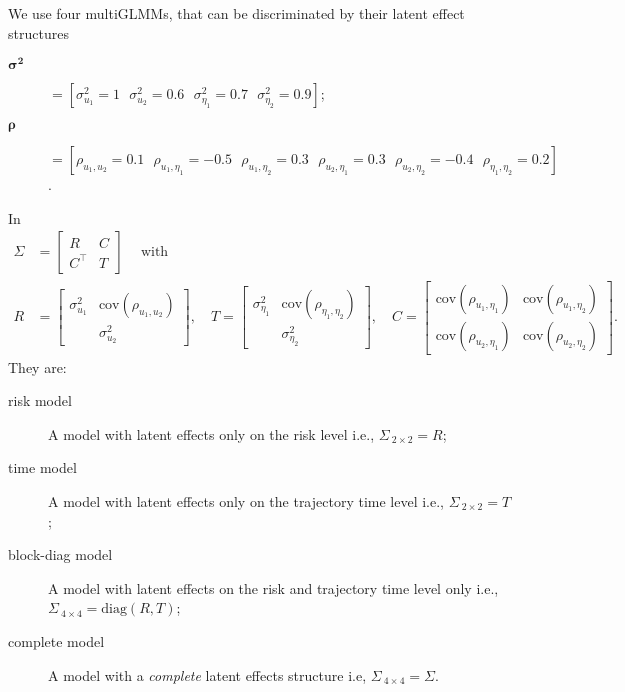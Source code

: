 We use four multiGLMMs, that can be discriminated by their latent effect
structures
\begin{description}
 \item[\(\bm{\sigma^{2}}\)] \(= [\sigma_{u_{1}}^{2} = 1~~~
                                \sigma_{u_{2}}^{2} = 0.6~~~
                                \sigma_{\eta_{1}}^{2} = 0.7~~~
                                \sigma_{\eta_{2}}^{2} = 0.9]\);
 \item[\(\bm{\rho}\)] \(= [\rho_{u_{1},u_{2}} = 0.1~~~
                           \rho_{u_{1},\eta_{1}} = -0.5~~~
                           \rho_{u_{1},\eta_{2}} = 0.3~~~
                           \rho_{u_{2},\eta_{1}} = 0.3~~~
                           \rho_{u_{2},\eta_{2}} = -0.4~~~
                           \rho_{\eta_{1},\eta_{2}} = 0.2]\).
\end{description}
In
\begin{align*}
 \Sigma &= \begin{bmatrix} R & C\\ C^{\top} & T \end{bmatrix}
 \quad~\text{with}\\
 R &= \begin{bmatrix}
       \sigma_{u_{1}}^{2} & \text{cov}(\rho_{u_{1},u_{2}})\\
                      & \sigma_{u_{2}}^{2}
      \end{bmatrix},\quad
 T = \begin{bmatrix}
      \sigma_{\eta_{1}}^{2} & \text{cov}(\rho_{\eta_{1},\eta_{2}})\\
                         & \sigma_{\eta_{2}}^{2}
     \end{bmatrix},\quad
 C = \begin{bmatrix} \text{cov}(\rho_{u_{1},\eta_{1}}) &
                     \text{cov}(\rho_{u_{1},\eta_{2}})\\
                     \text{cov}(\rho_{u_{2},\eta_{1}}) &
                     \text{cov}(\rho_{u_{2},\eta_{2}})
     \end{bmatrix}.
\end{align*}
They are:
\begin{description}
 \item[risk model] A model with latent effects only on the risk level
      i.e., \(\Sigma_{~2\times2} = R\);

 \item[time model] A model with latent effects only on the trajectory
      time level i.e., \(\Sigma_{~2\times2} = T\);

 \item[block-diag model] A model with latent effects on the risk and
      trajectory time level only i.e., \(\Sigma_{~4\times4} =
      \text{diag}(R, T)\);

 \item[complete model] A model with a \textit{complete} latent effects
      structure i.e, \(\Sigma_{~4\times4} = \Sigma\).
\end{description}

